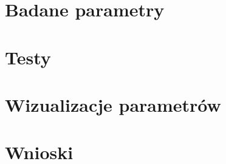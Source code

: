 \documentclass{article}
\begin{document}
\section{Badane parametry}

\section{Testy}

\section{Wizualizacje parametrów}

\section{Wnioski}
\end{document}
